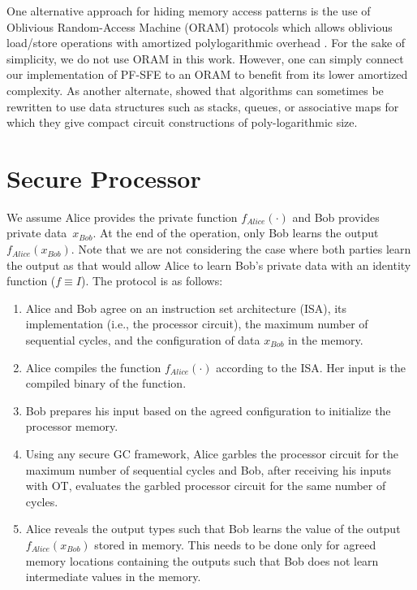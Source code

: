 One alternative approach for hiding memory access patterns is the use of Oblivious Random-Access Machine (ORAM) protocols \cite{goldreich1996software} which allows oblivious load/store operations with amortized polylogarithmic overhead \cite{gordon2012secure,liu2014automating,LO13,gentry2014garbled}.
For the sake of simplicity, we do not use ORAM in this work.
However, one can simply connect our implementation of PF-SFE to an ORAM to benefit from its lower amortized complexity.
As another alternate, \cite{ZE13} showed that algorithms can sometimes be rewritten to use data structures such as stacks, queues, or associative maps for which they give compact circuit constructions of poly-logarithmic size.

\section{Secure Processor}
We assume Alice provides the private function $f_{Alice}(\cdot)$ and Bob provides private data~$x_{Bob}$.
At the end of the operation, only Bob learns the output $f_{Alice}(x_{Bob})$.
Note that we are not considering the case where both parties learn the output as that would allow Alice to learn Bob's private data with an identity function ($f\equiv I$).
The protocol is as follows:

\begin{enumerate}
\item
  Alice and Bob agree on an instruction set architecture (ISA), its implementation (i.e., the processor circuit), the maximum number of sequential cycles, and the configuration of data $x_{Bob}$ in the memory.
\item
  Alice compiles the function $f_{Alice}(\cdot)$ according to the ISA.
  Her input is the compiled binary of the function.
\item
  Bob prepares his input based on the agreed configuration to initialize the processor memory.
\item
  Using any secure GC framework, Alice garbles the processor circuit for the maximum number of sequential cycles and Bob, after receiving his inputs with OT, evaluates the garbled processor circuit for the same number of cycles.

\item
  Alice reveals the output types such that Bob learns the value of the output $f_{Alice}(x_{Bob})$ stored in memory.
  This needs to be done only for agreed memory locations containing the outputs such that Bob does not learn intermediate values in the memory.
\end{enumerate}

